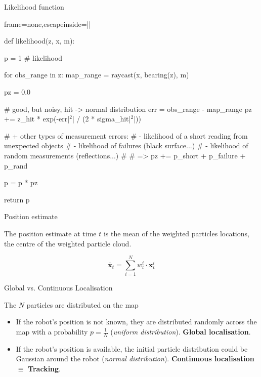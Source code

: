 \documentclass[compress,xcolor=table]{beamer}
\begin{document}

\begin{frame}[fragile]{Likelihood function}

\begin{pythoncode*}{frame=none,escapeinside=||}

def likelihood(z, x, m):

    p = 1 # likelihood

    for obs_range in z:
        map_range = raycast(x, bearing(z), m)

        pz = 0.0

        # good, but noisy, hit -> normal distribution
        err = obs_range - map_range
        pz += z_hit * exp(-err|$^2$| / (2 * sigma_hit|$^2$|))

        # + other types of measurement errors:
        #    - likelihood of a short reading from unexpected objects
        #    - likelihood of failures (black surface...)
        #    - likelihood of random measurements (reflections...)
        #
        # => pz += p_short + p_failure + p_rand

        p = p * pz

    return p
\end{pythoncode*}

\end{frame}




\begin{frame}{Position estimate}

    The position estimate at time $t$ is the mean of the weighted particles locations,
    \ie the centre of the weighted particle cloud.

    \Large
    \[
        \bar{\mathbf{x}}_t = \sum^N_{i=1} w^i_t \cdot \mathbf{x}^i_t
    \]
\end{frame}

\begin{frame}{Global vs. Continuous Localisation}

    The $N$ particles are distributed on the map

    \begin{itemize}
        \item If the robot's position is not known, they are distributed randomly
            across the map with a probability $p=\frac{1}{N}$ (\emph{uniform
            distribution}). \textbf{Global localisation}.

        \item If the robot's position is available, the initial particle
            distribution could be Gaussian around the robot (\emph{normal
            distribution}). \textbf{Continuous localisation} $\equiv$
            \textbf{Tracking}.
    \end{itemize}

\end{frame}
\end{document}
